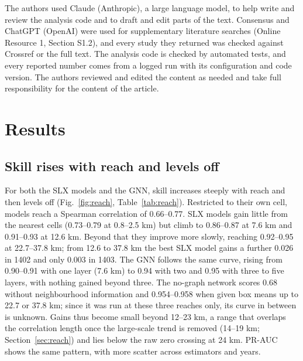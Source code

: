 \documentclass[pdflatex,sn-basic]{sn-jnl}
\begin{document}
The authors used Claude (Anthropic), a large language model, to help write and review the analysis code and to draft and edit parts of the text. Consensus and ChatGPT (OpenAI) were used for supplementary literature searches (Online Resource 1, Section S1.2), and every study they returned was checked against Crossref or the full text. The analysis code is checked by automated tests, and every reported number comes from a logged run with its configuration and code version. The authors reviewed and edited the content as needed and take full responsibility for the content of the article.

\section{Results}\label{sec:results}

\subsection{Skill rises with reach and levels off}\label{sec:curve}

For both the SLX models and the GNN, skill increases steeply with reach and then levels off (Fig.~\ref{fig:reach}, Table~\ref{tab:reach}). Restricted to their own cell, models reach a Spearman correlation of 0.66--0.77. SLX models gain little from the nearest cells (0.73--0.79 at 0.8--2.5 km) but climb to 0.86--0.87 at 7.6 km and 0.91--0.93 at 12.6 km. Beyond that they improve more slowly, reaching 0.92--0.95 at 22.7--37.8 km; from 12.6 to 37.8 km the best SLX model gains a further 0.026 in 1402 and only 0.003 in 1403. The GNN follows the same curve, rising from 0.90--0.91 with one layer (7.6 km) to 0.94 with two and 0.95 with three to five layers, with nothing gained beyond three. The no-graph network scores 0.68 without neighbourhood information and 0.954--0.958 when given box means up to 22.7 or 37.8 km; since it was run at these three reaches only, its curve in between is unknown. Gains thus become small beyond 12--23 km, a range that overlaps the correlation length once the large-scale trend is removed (14--19 km; Section~\ref{sec:reach}) and lies below the raw zero crossing at 24 km. PR-AUC shows the same pattern, with more scatter across estimators and years.
\end{document}
